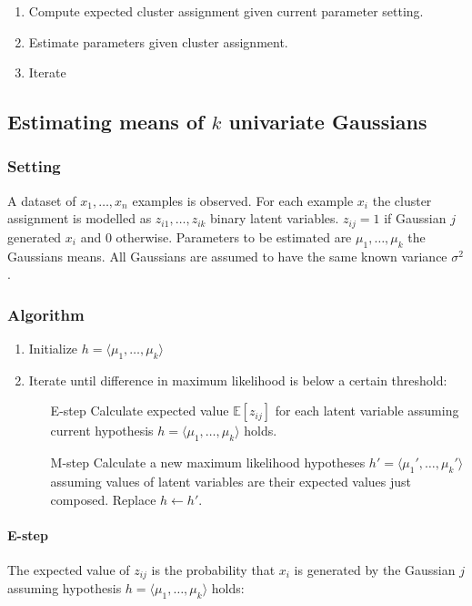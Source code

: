 	\begin{enumerate}
		\item Compute expected cluster assignment given current parameter setting.
		\item Estimate parameters given cluster assignment.
		\item Iterate
	\end{enumerate}

	\subsection{Estimating means of $k$ univariate Gaussians}

		\subsubsection{Setting}
		A dataset of $x_1,\dots,x_n$ examples is observed.
		For each example $x_i$ the cluster assignment is modelled as $z_{i1}, \dots, z_{ik}$ binary latent variables.
		$z_{ij}=1$ if Gaussian $j$ generated $x_{i}$ and $0$ otherwise.
		Parameters to be estimated are $\mu_1, \dots,\mu_k$ the Gaussians means.
		All Gaussians are assumed to have the same known variance $\sigma^2$.

		\subsubsection{Algorithm}
		
		\begin{enumerate}
			\item Initialize $h = \langle\mu_1,\dots,\mu_k\rangle$
			\item Iterate until difference in maximum likelihood is below a certain threshold:

				\begin{itemize}
					\item[E-step] Calculate expected value $\mathbb{E}[z_{ij}]$ for each latent variable assuming current hypothesis $h = \langle \mu_1, \dots,\mu_k\rangle$ holds.
					\item[M-step] Calculate a new maximum likelihood hypotheses $h' = \langle\mu_1',\dots,\mu_k'\rangle$ assuming values of latent variables are their expected values just composed.
						Replace $h\leftarrow h'$.
				\end{itemize}
		\end{enumerate}

			\paragraph{E-step}
			The expected value of $z_{ij}$ is the probability that $x_i$ is generated by the Gaussian $j$ assuming hypothesis $h = \langle\mu_1,\dots,\mu_k\rangle$ holds:

